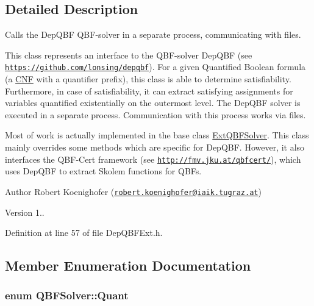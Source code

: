 \subsection{Detailed Description}
Calls the Dep\-Q\-B\-F Q\-B\-F-\/solver in a separate process, communicating with files. 

This class represents an interface to the Q\-B\-F-\/solver Dep\-Q\-B\-F (see \href{https://github.com/lonsing/depqbf}{\tt https\-://github.\-com/lonsing/depqbf}). For a given Quantified Boolean formula (a \hyperlink{classCNF}{C\-N\-F} with a quantifier prefix), this class is able to determine satisfiability. Furthermore, in case of satisfiability, it can extract satisfying assignments for variables quantified existentially on the outermost level. The Dep\-Q\-B\-F solver is executed in a separate process. Communication with this process works via files.

Most of work is actually implemented in the base class \hyperlink{classExtQBFSolver}{Ext\-Q\-B\-F\-Solver}. This class mainly overrides some methods which are specific for Dep\-Q\-B\-F. However, it also interfaces the Q\-B\-F-\/\-Cert framework (see \href{http://fmv.jku.at/qbfcert/}{\tt http\-://fmv.\-jku.\-at/qbfcert/}), which uses Dep\-Q\-B\-F to extract Skolem functions for Q\-B\-Fs.

\begin{DoxyAuthor}{Author}
Robert Koenighofer (\href{mailto:robert.koenighofer@iaik.tugraz.at}{\tt robert.\-koenighofer@iaik.\-tugraz.\-at}) 
\end{DoxyAuthor}
\begin{DoxyVersion}{Version}
1.. 
\end{DoxyVersion}


Definition at line 57 of file Dep\-Q\-B\-F\-Ext.\-h.



\subsection{Member Enumeration Documentation}
\hypertarget{classQBFSolver_ac091e263cb55286cc07b2451bcf4d3c7}{
\subsubsection[{Quant}]{\setlength{\rightskip}{0pt plus 5cm}enum {\bf Q\-B\-F\-Solver\-::\-Quant}\hspace{0.3cm}{\ttfamily [inherited]}}}\label{classQBFSolver_ac091e263cb55286cc07b2451bcf4d3c7}


